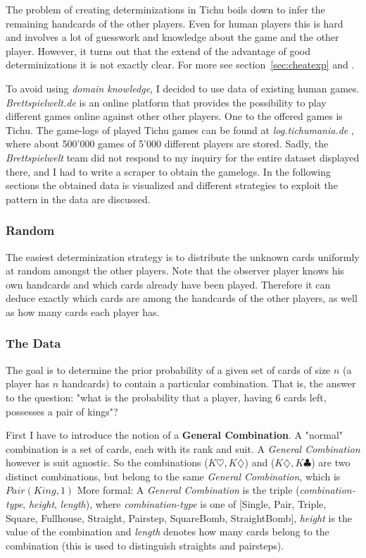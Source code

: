 The problem of creating determinizations in Tichu boils down to infer the remaining handcards of the other players. Even for human players this is hard and involves a lot of guesswork and knowledge about the game and the other player. However, it turns out that the extend of the advantage of good determinizations it is not exactly clear. For more see section~\ref{sec:cheatexp} and \cite{ismcts}.

To avoid using \textit{domain knowledge}, I decided to use data of existing human games. \textit{Brettspielwelt.de} is an online platform that provides the possibility to play different games online against other other players. One to the offered games is Tichu. The game-logs of played Tichu games can be found at \textit{log.tichumania.de} \cite{tichumania}, where about 500'000 games of 5'000 different players are stored.
Sadly, the \textit{Brettspielwelt} team did not respond to my inquiry for the entire dataset displayed there, and I had to write a scraper to obtain the gamelogs.
In the following sections the obtained data is visualized and different strategies to exploit the pattern in the data are discussed.

\subsubsection{Random}
The easiest determinization strategy is to distribute the unknown cards uniformly at random amongst the other players.
Note that the observer player knows his own handcards and which cards already have been played. Therefore it can deduce exactly which cards are among the handcards of the other players, as well as how many cards each player has.


\subsubsection{The Data}
The goal is to determine the prior probability of a given set of cards of size $n$ (a player has $n$ handcards) to contain a particular combination. That is, the answer to the question: "what is the probability that a player, having 6 cards left, possesses a pair of kings"?

First I have to introduce the notion of a \textbf{General Combination}. A "normal" combination is a set of cards, each with its rank and suit. A \textit{General Combination} however is suit agnostic. So the combinations ($K\heartsuit, K\diamondsuit$) and ($K\diamondsuit, K\clubsuit$) are two distinct combinations, but belong to the same \textit{General Combination}, which is $Pair(King, 1)$ \newline
More formal: A \textit{General Combination} is the triple (\textit{combination-type}, \textit{height}, \textit{length}), where \textit{combination-type} is one of [Single, Pair, Triple, Square, Fullhouse, Straight, Pairstep, SquareBomb, StraightBomb], \textit{height} is the value of the combination and \textit{length} denotes how many cards belong to the combination (this is used to distinguish straights and pairsteps).

